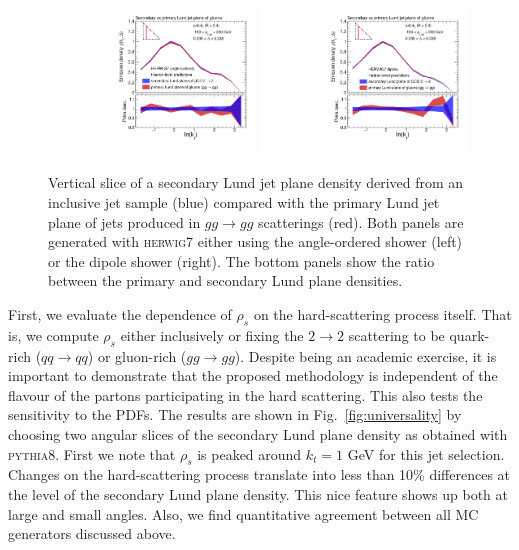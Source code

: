 \documentclass[a4paper,11pt]{article}
\newcommand{\py}{{\textsc{pythia}}8\xspace}
\newcommand{\hw}{{\textsc{herwig}}7\xspace}
\begin{document}
\begin{figure}
    \centering
    \includegraphics[width = 0.49\textwidth]{figures/Figure4a.pdf}
    \includegraphics[width = 0.49\textwidth]{figures/Figure4b.pdf}
    \caption{Vertical slice of a secondary Lund jet plane density derived from an inclusive jet sample (blue) compared with the primary Lund jet plane of jets produced in $gg\to gg$ scatterings (red). Both panels are generated with \hw either using the angle-ordered shower (left) or the dipole shower (right). The bottom panels show the ratio between the primary and secondary Lund plane densities.}
    \label{fig:secLP-vs-gg}
\end{figure}

First, we evaluate the dependence of $\rho_s$ on the hard-scattering process itself. That is, we compute $\rho_s$ either inclusively or fixing the $2\to 2$ scattering to be quark-rich ($qq\to qq$) or gluon-rich ($gg\to gg$). Despite being an academic exercise, it is important to demonstrate that the proposed methodology is independent of the flavour of the partons participating in the hard scattering. This also tests the sensitivity to the PDFs. The results are shown in Fig.~\ref{fig:universality} by choosing two angular slices of the secondary Lund plane density as obtained with \py. First we note that $\rho_s$ is peaked around $k_t=1$ GeV for this jet selection. Changes on the hard-scattering process translate into less than 10\% differences at the level of the secondary Lund plane density. This nice feature shows up both at large and small angles. Also, we find quantitative agreement between all MC generators discussed above.    
\end{document}
